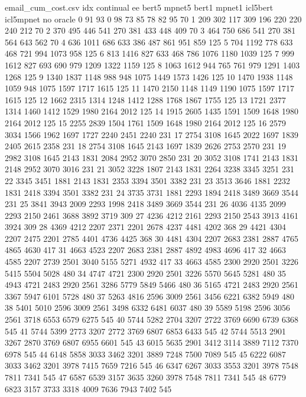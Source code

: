 \begin{filecontents*}{email_cum_cost.csv}
idx	continual	ee	bert5	mpnet5	bert1	mpnet1	icl5bert	icl5mpnet	no	oracle
0	91	93	0	98	73	85	78	82	95	70
1	209	302	117	309	196	220	220	240	212	70
2	370	495	446	541	270	381	433	448	409	70
3	464	750	686	541	270	381	564	643	562	70
4	636	1011	686	633	386	487	861	951	859	125
5	704	1192	778	633	468	721	994	1073	958	125
6	813	1416	827	633	468	786	1076	1180	1039	125
7	999	1612	827	693	690	979	1209	1322	1159	125
8	1063	1612	944	765	761	979	1291	1403	1268	125
9	1340	1837	1148	988	948	1075	1449	1573	1426	125
10	1470	1938	1148	1059	948	1075	1597	1717	1615	125
11	1470	2150	1148	1149	1190	1075	1597	1717	1615	125
12	1662	2315	1314	1248	1412	1288	1768	1867	1755	125
13	1721	2377	1314	1460	1412	1529	1980	2164	2012	125
14	1915	2605	1435	1591	1509	1648	1980	2164	2012	125
15	2255	2839	1504	1761	1509	1648	1980	2164	2012	125
16	2579	3034	1566	1962	1697	1727	2240	2451	2240	231
17	2754	3108	1645	2022	1697	1839	2405	2615	2358	231
18	2754	3108	1645	2143	1697	1839	2626	2753	2570	231
19	2982	3108	1645	2143	1831	2084	2952	3070	2850	231
20	3052	3108	1741	2143	1831	2148	2952	3070	3016	231
21	3052	3228	1807	2143	1831	2264	3238	3345	3251	231
22	3345	3451	1881	2143	1831	2353	3394	3501	3382	231
23	3513	3646	1881	2232	1831	2418	3394	3501	3382	231
24	3735	3731	1881	2293	1894	2418	3489	3669	3544	231
25	3841	3943	2009	2293	1998	2418	3489	3669	3544	231
26	4036	4135	2099	2293	2150	2461	3688	3892	3719	309
27	4236	4212	2161	2293	2150	2543	3913	4161	3924	309
28	4369	4212	2207	2371	2201	2678	4237	4481	4202	368
29	4421	4304	2207	2475	2201	2785	4401	4736	4425	368
30	4481	4304	2207	2683	2381	2887	4765	4865	4630	417
31	4663	4523	2207	2683	2381	2887	4892	4983	4696	417
32	4663	4585	2207	2739	2501	3040	5155	5271	4932	417
33	4663	4585	2300	2920	2501	3226	5415	5504	5028	480
34	4747	4721	2300	2920	2501	3226	5570	5645	5281	480
35	4943	4721	2483	2920	2561	3286	5779	5849	5466	480
36	5165	4721	2483	2920	2561	3367	5947	6101	5728	480
37	5263	4816	2596	3009	2561	3456	6221	6382	5949	480
38	5401	5010	2596	3009	2561	3498	6332	6481	6037	480
39	5589	5198	2596	3056	2561	3718	6553	6579	6275	545
40	5744	5282	2704	3207	2722	3769	6690	6739	6368	545
41	5744	5399	2773	3207	2772	3769	6807	6853	6433	545
42	5744	5513	2901	3267	2870	3769	6807	6955	6601	545
43	6015	5635	2901	3412	3114	3889	7112	7370	6978	545
44	6148	5858	3033	3462	3201	3889	7248	7500	7089	545
45	6222	6087	3033	3462	3201	3978	7415	7659	7216	545
46	6347	6267	3033	3553	3201	3978	7548	7811	7341	545
47	6587	6539	3157	3635	3260	3978	7548	7811	7341	545
48	6779	6823	3157	3733	3318	4009	7636	7943	7402	545

\end{filecontents*}

